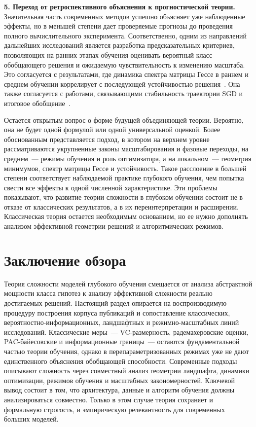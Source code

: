 \textbf{5. Переход от ретроспективного объяснения к прогностической теории.}
Значительная часть современных методов успешно объясняет уже наблюденные эффекты, но в меньшей степени дает проверяемые прогнозы до проведения полного вычислительного эксперимента.
Соответственно, одним из направлений дальнейших исследований является разработка предсказательных критериев, позволяющих на ранних этапах обучения оценивать вероятный класс обобщающего решения и ожидаемую чувствительность к изменению масштаба.
Это согласуется с результатами, где динамика спектра матрицы Гессе в раннем и среднем обучении коррелирует с последующей устойчивостью решения~\cite{hessian2019sgd,hessianpowerlaw2022}.
Она также согласуется с работами, связывающими стабильность траектории SGD и итоговое обобщение~\cite{sgdstability2023,sgd2020stability}.

Остается открытым вопрос о форме будущей объединяющей теории.
Вероятно, она не будет одной формулой или одной универсальной оценкой.
Более обоснованным представляется подход, в котором на верхнем уровне рассматриваются укрупненные законы масштабирования и фазовые переходы, на среднем~--- режимы обучения и роль оптимизатора, а на локальном~--- геометрия минимумов, спектр матрицы Гессе и устойчивость.
Такое расслоение в большей степени соответствует наблюдаемой практике глубокого обучения, чем попытка свести все эффекты к одной численной характеристике.
Эти проблемы показывают, что развитие теории сложности в глубоком обучении состоит не в отказе от классических результатов, а в их переинтерпретации и расширении.
Классическая теория остается необходимым основанием, но ее нужно дополнять анализом эффективной геометрии решений и алгоритмических режимов.

\section{Заключение обзора}

Теория сложности моделей глубокого обучения смещается от анализа абстрактной мощности класса гипотез к анализу эффективной сложности реально достигаемых решений.
Настоящий раздел опирается на воспроизводимую процедуру построения корпуса публикаций и сопоставление классических, вероятностно-информационных, ландшафтных и режимно-масштабных линий исследований.
Классические меры~--- VC-размерность, радемахеровские оценки, PAC-байесовские и информационные границы~--- остаются фундаментальной частью теории обучения, однако в перепараметризованных режимах уже не дают единственного объяснения обобщающей способности.
Современные подходы описывают сложность через совместный анализ геометрии ландшафта, динамики оптимизации, режимов обучения и масштабных закономерностей.
Ключевой вывод состоит в том, что архитектура, данные и алгоритм обучения должны анализироваться совместно. Только в этом случае теория сохраняет и формальную строгость, и эмпирическую релевантность для современных больших моделей.

